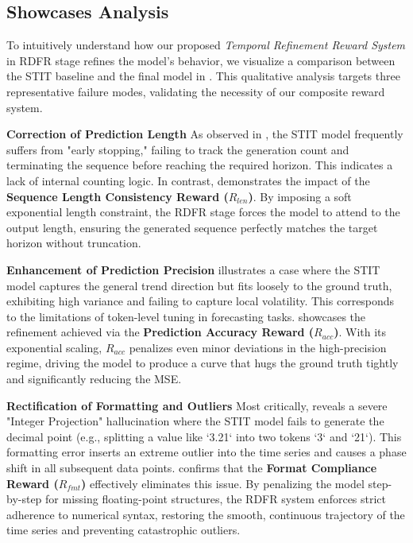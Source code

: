 \subsection{Showcases Analysis}



To intuitively understand how our proposed \textit{Temporal Refinement Reward System} in RDFR stage refines the model's behavior, we visualize a comparison between the STIT baseline and the final \method{} model in . This qualitative analysis targets three representative failure modes, validating the necessity of our composite reward system.

\textbf{Correction of Prediction Length}
As observed in , the STIT model frequently suffers from "early stopping," failing to track the generation count and terminating the sequence before reaching the required horizon. This indicates a lack of internal counting logic. In contrast,  demonstrates the impact of the \textbf{Sequence Length Consistency Reward ($R_{len}$)}. By imposing a soft exponential length constraint, the RDFR stage forces the model to attend to the output length, ensuring the generated sequence perfectly matches the target horizon without truncation.

\textbf{Enhancement of Prediction Precision}
 illustrates a case where the STIT model captures the general trend direction but fits loosely to the ground truth, exhibiting high variance and failing to capture local volatility. This corresponds to the limitations of token-level tuning in forecasting tasks.  showcases the refinement achieved via the \textbf{Prediction Accuracy Reward ($R_{acc}$)}. With its exponential scaling, $R_{acc}$ penalizes even minor deviations in the high-precision regime, driving the model to produce a curve that hugs the ground truth tightly and significantly reducing the MSE.

\textbf{Rectification of Formatting and Outliers}
Most critically,  reveals a severe "Integer Projection" hallucination where the STIT model fails to generate the decimal point (e.g., splitting a value like `3.21` into two tokens `3` and `21`). This formatting error inserts an extreme outlier into the time series and causes a phase shift in all subsequent data points.  confirms that the \textbf{Format Compliance Reward ($R_{fmt}$)} effectively eliminates this issue. By penalizing the model step-by-step for missing floating-point structures, the RDFR system enforces strict adherence to numerical syntax, restoring the smooth, continuous trajectory of the time series and preventing catastrophic outliers.

